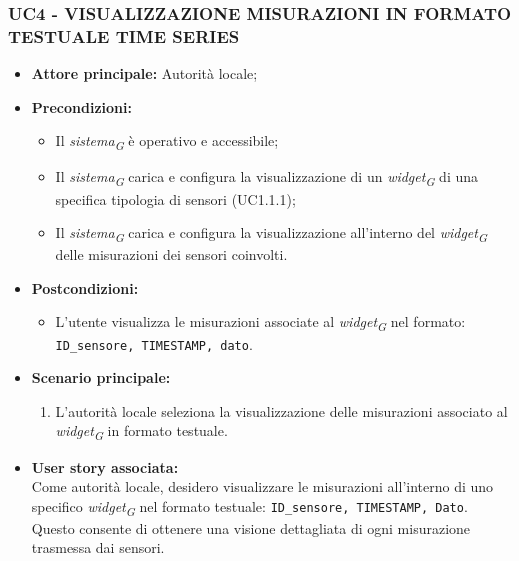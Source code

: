 \subsubsection{UC4 - VISUALIZZAZIONE MISURAZIONI IN FORMATO TESTUALE TIME SERIES}
\begin{itemize}
      \item \textbf{Attore principale:} Autorità locale;
      \item \textbf{Precondizioni:}
            \begin{itemize}
                  \item Il \textit{sistema}\textsubscript{\textit{G}} è operativo e accessibile;
                  \item Il \textit{sistema}\textsubscript{\textit{G}} carica e configura la visualizzazione di un \textit{widget}\textsubscript{\textit{G}} di una specifica tipologia di sensori (UC1.1.1);
                  \item Il \textit{sistema}\textsubscript{\textit{G}} carica e configura la visualizzazione all'interno del \textit{widget}\textsubscript{\textit{G}} delle misurazioni dei sensori coinvolti.
            \end{itemize}
      \item \textbf{Postcondizioni:}
            \begin{itemize}
                  \item L'utente visualizza le misurazioni associate al \textit{widget}\textsubscript{\textit{G}} nel formato: \texttt{ID\_sensore, TIMESTAMP, dato}.
            \end{itemize}
      \item \textbf{Scenario principale:}
            \begin{enumerate}
                  \item L'autorità locale seleziona la visualizzazione delle misurazioni associato al \textit{widget}\textsubscript{\textit{G}} in formato testuale.
            \end{enumerate}
      \item \textbf{User story associata:} \\
            Come autorità locale, desidero visualizzare le misurazioni all'interno di uno specifico \textit{widget}\textsubscript{\textit{G}} nel formato testuale: \texttt{ID\_sensore, TIMESTAMP, Dato}. Questo consente di ottenere una visione dettagliata di ogni misurazione trasmessa dai sensori.
\end{itemize}